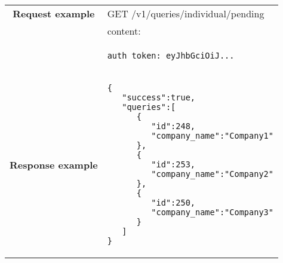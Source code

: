 \begin{adjustwidth}{1cm}{}
\begin{longtable}{|c|l|}
                           \textbf{Request example}
             & GET /v1/queries/individual/pending \\
             & content: \\
            & \begin{minipage}[t]{0.5\textwidth}
                \begin{adjustwidth}{1.5cm}{}
                \begin{verbatim}
auth_token: eyJhbGciOiJ...
                \end{verbatim}
                \end{adjustwidth}
              \end{minipage} \\
            \hline
             \textbf{Response example} & 
              \begin{minipage}[t]{0.5\textwidth}
                \begin{adjustwidth}{1.5cm}{}
                \begin{verbatim}
{
   "success":true,
   "queries":[
      {
         "id":248,
         "company_name":"Company1"
      },
      {
         "id":253,
         "company_name":"Company2"
      },
      {
         "id":250,
         "company_name":"Company3"
      }
   ]
}
                \end{verbatim}
                \end{adjustwidth}
              \end{minipage} \\
              \hline
 
        \end{longtable}
    \end{adjustwidth}
    
